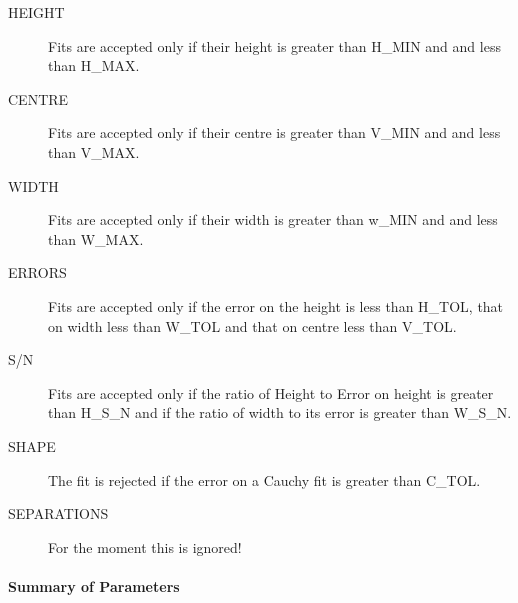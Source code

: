 \begin{description}
\item[HEIGHT] Fits are accepted only if their height is greater than
H\_MIN and and less than H\_MAX.
\item[CENTRE] Fits are accepted only if their centre is greater than
V\_MIN and and less than V\_MAX.
\item[WIDTH] Fits are accepted only if their width is greater than
w\_MIN and and less than W\_MAX.
\item[ERRORS] Fits are accepted only if the error on the height is less
than H\_TOL, that on width less than W\_TOL and that on centre less than
V\_TOL.
\item[S/N] Fits are accepted only if the ratio of Height to Error on
height is greater than H\_S\_N and if the ratio of width to its error is
greater than W\_S\_N.
\item[SHAPE] The fit is rejected if the error on a Cauchy fit is
  greater than C\_TOL.
\item[SEPARATIONS] For the moment this is ignored!
\end{description}

\paragraph{Summary of Parameters}

